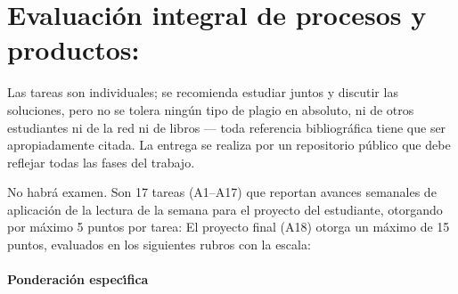 \section{Evaluaci\'{o}n integral de procesos y productos:}

\quad

Las tareas son individuales; se recomienda estudiar juntos y discutir
las soluciones, pero no se tolera ning\'{u}n tipo de plagio en
absoluto, ni de otros estudiantes ni de la red ni de libros --- toda
referencia bibliogr\'{a}fica tiene que ser apropiadamente citada. La
entrega se realiza por un repositorio p\'{u}blico que debe reflejar todas
las fases del trabajo. 

No habr\'{a} examen.  Son 17 tareas (A1--A17) que reportan avances
semanales de aplicaci\'{o}n de la lectura de la semana para el
proyecto del estudiante, otorgando por m\'{a}ximo 5 puntos por
tarea:  El proyecto final (A18) otorga un
m\'{a}ximo de 15 puntos, evaluados en los siguientes
rubros  con la escala: 

\paragraph{Ponderaci\'{o}n espec\'{\i}fica}

\quad

  
